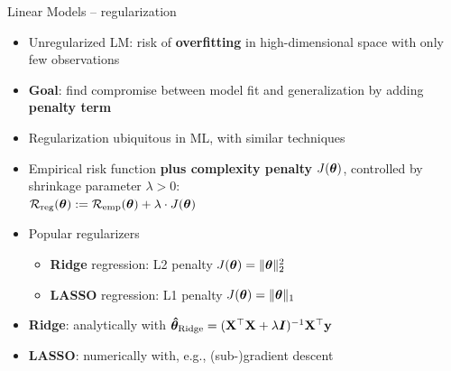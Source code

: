 
\begin{frame}{Linear Models -- regularization}


\begin{itemize}
  \item Unregularized LM: risk of \textbf{overfitting} in high-dimensional 
  space with only few observations
  \item \textbf{Goal}: find compromise between model fit and generalization by 
  adding \textbf{penalty term}
  \item Regularization ubiquitous in ML, with similar techniques
\end{itemize}

\medskip




\medskip


\begin{itemize}
  \item Empirical risk function \textbf{plus complexity penalty} 
  $J(\bm{\theta})$, controlled by shrinkage parameter $\lambda > 0$: \\
  $\mathcal{R}_{\text{reg}}(\bm{\theta}) := \mathcal{R}_{\text{emp}}(\bm{\theta}) + \lambda \cdot J(\bm{\theta})$ 
  \item Popular regularizers
  \begin{itemize} 
    \item \textbf{Ridge} regression: L2 penalty $J(\bm{\theta}) = \|\bm{\theta}\|_2^2 $
    \item \textbf{LASSO} regression: L1 penalty $J(\bm{\theta}) = \|\bm{\theta}\|_1 $
  \end{itemize}
\end{itemize}

\medskip

\begin{itemize}
  \item \textbf{Ridge}: analytically with 
  $\bm{\hat\theta}_{\text{Ridge}} = (\mathbf{X}^\top \mathbf{X}  + \lambda \boldsymbol{I})^{-1} \mathbf{X}^\top 
  \mathbf{y}$
  \item \textbf{LASSO}: numerically with, e.g., (sub-)gradient descent
\end{itemize}

\end{frame}

